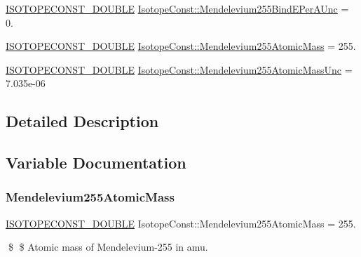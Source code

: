 \begin{DoxyCompactItemize}
\item 
\mbox{\hyperlink{group___isotope_const-_macros_ga8f45a7272ce02c0b4c65c44636ed719a}{I\+S\+O\+T\+O\+P\+E\+C\+O\+N\+S\+T\+\_\+\+D\+O\+U\+B\+LE}} \mbox{\hyperlink{group___isotope_const-_mendelevium-_md255_ga088502dc0131153780d79677e17cfcfb}{Isotope\+Const\+::\+Mendelevium255\+Bind\+E\+Per\+A\+Unc}} = 0.
\item 
\mbox{\hyperlink{group___isotope_const-_macros_ga8f45a7272ce02c0b4c65c44636ed719a}{I\+S\+O\+T\+O\+P\+E\+C\+O\+N\+S\+T\+\_\+\+D\+O\+U\+B\+LE}} \mbox{\hyperlink{group___isotope_const-_mendelevium-_md255_gabc80d23f84b09622469159a8a1306993}{Isotope\+Const\+::\+Mendelevium255\+Atomic\+Mass}} = 255.
\item 
\mbox{\hyperlink{group___isotope_const-_macros_ga8f45a7272ce02c0b4c65c44636ed719a}{I\+S\+O\+T\+O\+P\+E\+C\+O\+N\+S\+T\+\_\+\+D\+O\+U\+B\+LE}} \mbox{\hyperlink{group___isotope_const-_mendelevium-_md255_ga246815c985291cbce660e9bb89895fa6}{Isotope\+Const\+::\+Mendelevium255\+Atomic\+Mass\+Unc}} = 7.\+035e-\/06
\end{DoxyCompactItemize}


\subsection{Detailed Description}


\subsection{Variable Documentation}
\mbox{\label{group___isotope_const-_mendelevium-_md255_gabc80d23f84b09622469159a8a1306993}} 
\subsubsection{\texorpdfstring{Mendelevium255\+Atomic\+Mass}{Mendelevium255AtomicMass}}
{\footnotesize\ttfamily \mbox{\hyperlink{group___isotope_const-_macros_ga8f45a7272ce02c0b4c65c44636ed719a}{I\+S\+O\+T\+O\+P\+E\+C\+O\+N\+S\+T\+\_\+\+D\+O\+U\+B\+LE}} Isotope\+Const\+::\+Mendelevium255\+Atomic\+Mass = 255.}

\$ \$ Atomic mass of Mendelevium-\/255 in amu. \mbox{\label{group___isotope_const-_mendelevium-_md255_ga246815c985291cbce660e9bb89895fa6}} 
